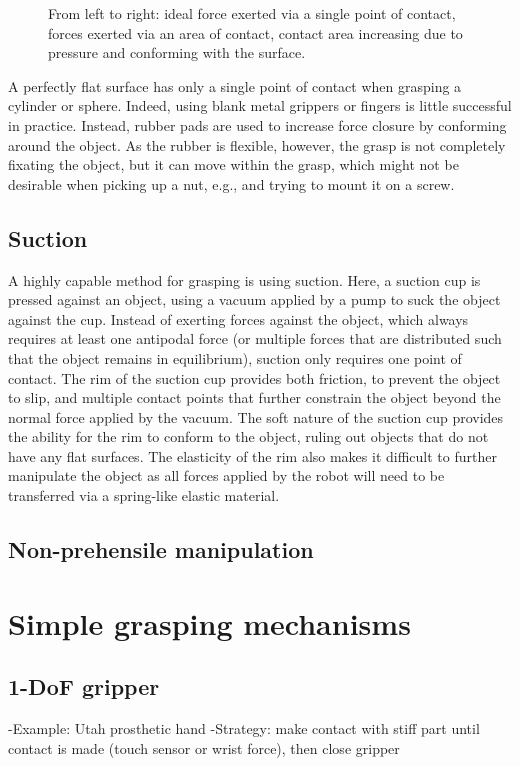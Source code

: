 \begin{figure}
\caption{From left to right: ideal force exerted via a single point of contact, forces exerted via an area of contact, contact area increasing due to pressure and conforming with the surface.\label{fig:contactarea}} 
\end{figure}

A perfectly flat surface has only a single point of contact when grasping a cylinder or sphere. Indeed, using blank metal grippers or fingers is little successful in practice. Instead, rubber pads are used to increase force closure by conforming around the object. As the rubber is flexible, however, the grasp is not completely fixating the object, but it can move within the grasp, which might not be desirable when picking up a nut, e.g., and trying to mount it on a screw. 

\subsection{Suction}

A highly capable method for grasping is using suction. Here, a suction cup is pressed against an object, using a vacuum applied by a pump to suck the object against the cup. Instead of exerting forces against the object, which always requires at least one antipodal force (or multiple forces that are distributed such that the object remains in equilibrium), suction only requires one point of contact. The rim of the suction cup provides both friction, to prevent the object to slip, and multiple contact points that further constrain the object beyond the normal force applied by the vacuum. The soft nature of the suction cup provides the ability for the rim to conform to the object, ruling out objects that do not have any flat surfaces. The elasticity of the rim also makes it difficult to further manipulate the object as all forces applied by the robot will need to be transferred via a spring-like elastic material. 

\subsection{Non-prehensile manipulation}

\section{Simple grasping mechanisms}

\subsection{1-DoF gripper}
-Example: Utah prosthetic hand
-Strategy: make contact with stiff part until contact is made (touch sensor or wrist force), then close gripper

